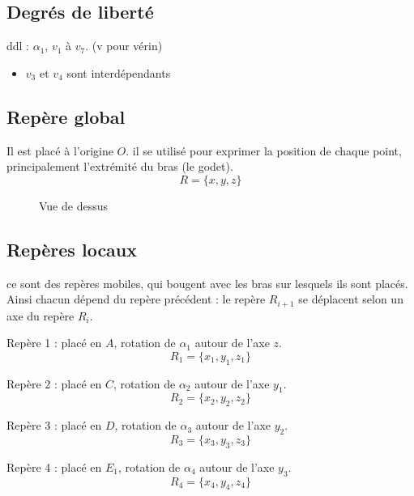 \documentclass[12pt,a4paper]{article}
\begin{document}
\subsection{Degrés de liberté}
ddl : $\alpha_1$, $v_1$ à $v_7$. (v pour vérin)\\
\begin{itemize}
	\item $v_3$ et $v_4$ sont interdépendants
\end{itemize}

\subsection{Repère global}

Il est placé à l'origine $O$. il se utilisé pour exprimer la position de chaque point, principalement l'extrémité du bras (le godet).
\begin{equation}
R=\{x,y,z\}
\end{equation}
\medbreak
\medbreak

\begin{figure}[H]
	\centering
	\caption{Vue de dessus}
\end{figure}

\subsection{Repères locaux}
ce sont des repères mobiles, qui bougent avec les bras sur lesquels ils sont placés. Ainsi chacun dépend du repère précédent : le repère $R_{i+1}$ se déplacent selon un axe du repère $R_i$.
\medbreak

Repère 1 : placé en $A$, rotation de $\alpha_1$ autour de l'axe $z$.
\begin{equation}
R_1=\{x_1,y_1,z_1\}
\end{equation}

\medbreak
Repère 2 : placé en $C$, rotation de $\alpha_2$ autour de l'axe $y_1$.
\begin{equation}
R_2=\{x_2,y_2,z_2\}
\end{equation}


\medbreak
Repère 3 : placé en $D$, rotation de $\alpha_3$ autour de l'axe $y_2$.
\begin{equation}
R_3=\{x_3,y_3,z_3\}
\end{equation}

\medbreak
Repère 4 : placé en $E_1$, rotation de $\alpha_4$ autour de l'axe $y_3$.
\begin{equation}
R_4=\{x_4,y_4,z_4\}
\end{equation}
\end{document}
